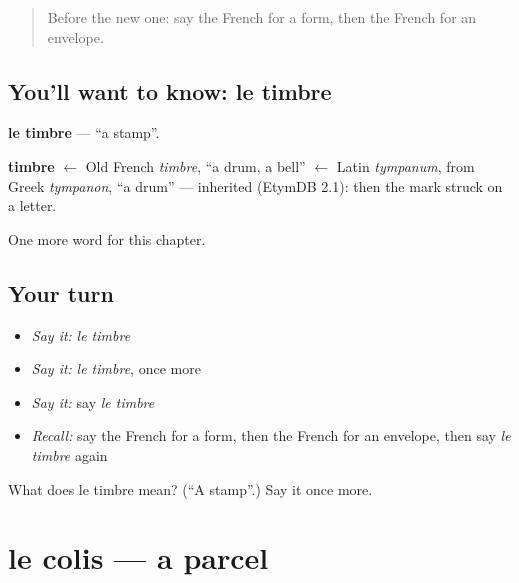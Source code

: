 \label{lesson:FR-C252-timbre}



\begin{quote}
Before the new one: say the French for a form, then the French for an envelope.
\end{quote}

\subsection*{You'll want to know: le timbre}
\textbf{le timbre} — \textquotedblleft{}a stamp\textquotedblright{}.

\begin{cousinweb}
\textbf{timbre} $\leftarrow$ Old French \emph{timbre}, \textquotedblleft{}a drum, a bell\textquotedblright{} $\leftarrow$ Latin \emph{tympanum}, from Greek \emph{tympanon}, \textquotedblleft{}a drum\textquotedblright{} — inherited (EtymDB 2.1): then the mark struck on a letter.
\end{cousinweb}

\begin{grammarlens}[title={What you've built}]
One more word for this chapter.
\end{grammarlens}

\subsection*{Your turn}
\begin{itemize}
\raggedright
  \item \emph{Say it:} \emph{le timbre}
  \item \emph{Say it:} \emph{le timbre}, once more
  \item \emph{Say it:} say \emph{le timbre}
  \item \emph{Recall:} say the French for a form, then the French for an envelope, then say \emph{le timbre} again
\end{itemize}

\begin{tcolorbox}[breakable,colback=teal!4,colframe=teal!35!black,title={Before you move on}]
What does le timbre mean? (\textquotedblleft{}A stamp\textquotedblright{}.) Say it once more.
\end{tcolorbox}
\section[le colis]{le colis — a parcel}

\label{lesson:FR-C252-colis}



